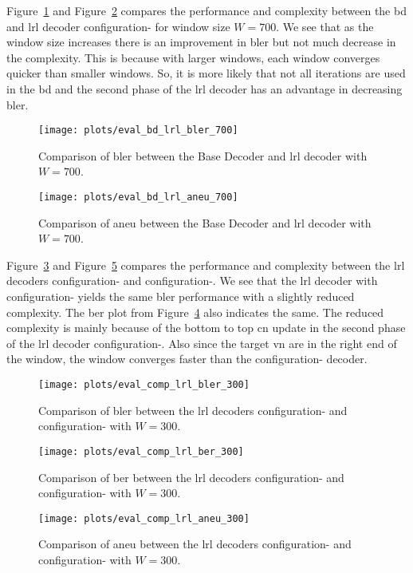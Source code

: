 Figure~\ref{fig:eval_bd_lrl_bler_700} and Figure~\ref{fig:eval_bd_lrl_aneu_700} compares the performance and complexity between the \gls{bd} and \gls{lrl} decoder configuration- for window size $W=700$. We see that as the window size increases there is an improvement in \gls{bler} but not much decrease in the complexity. This is because with larger windows, each window converges quicker than smaller windows. So, it is more likely that not all iterations are used in the \gls{bd} and the second phase of the \gls{lrl} decoder has an advantage in decreasing \gls{bler}. 
\begin{figure}[htbp]
  \centering
  \texttt{[image: plots/eval\_bd\_lrl\_bler\_700]}
  \caption{Comparison of \gls{bler} between the Base Decoder and \gls{lrl} decoder with $W=700$.}
  \label{fig:eval_bd_lrl_bler_700}
\end{figure}
\begin{figure}[htbp]
  \centering
  \texttt{[image: plots/eval\_bd\_lrl\_aneu\_700]}
  \caption{Comparison of \gls{aneu} between the Base Decoder and \gls{lrl} decoder with $W=700$.}
  \label{fig:eval_bd_lrl_aneu_700}
\end{figure}

Figure~\ref{fig:eval_comp_lrl_bler_300} and Figure~\ref{fig:eval_comp_lrl_aneu_300} compares the performance and complexity between the \gls{lrl} decoders configuration- and configuration-. We see that the \gls{lrl} decoder with configuration- yields the same \gls{bler} performance with a slightly reduced complexity. The \gls{ber} plot from Figure~\ref{fig:eval_comp_lrl_ber_300} also indicates the same. The reduced complexity is mainly because of the bottom to top \gls{cn} update in the second phase of the \gls{lrl} decoder configuration-. Also since the target \gls{vn} are in the right end of the window, the window converges faster than the configuration- decoder.
\begin{figure}[htbp]
  \centering
  \texttt{[image: plots/eval\_comp\_lrl\_bler\_300]}
  \caption{Comparison of \gls{bler} between the \gls{lrl} decoders configuration- and configuration- with $W=300$.}
  \label{fig:eval_comp_lrl_bler_300}
\end{figure}
\begin{figure}[htbp]
  \centering
  \texttt{[image: plots/eval\_comp\_lrl\_ber\_300]}
  \caption{Comparison of \gls{ber} between the \gls{lrl} decoders configuration- and configuration- with $W=300$.}
  \label{fig:eval_comp_lrl_ber_300}
\end{figure}
\begin{figure}[htbp]
  \centering
  \texttt{[image: plots/eval\_comp\_lrl\_aneu\_300]}
  \caption{Comparison of \gls{aneu} between the \gls{lrl} decoders configuration- and configuration- with $W=300$.}
  \label{fig:eval_comp_lrl_aneu_300}
\end{figure}

